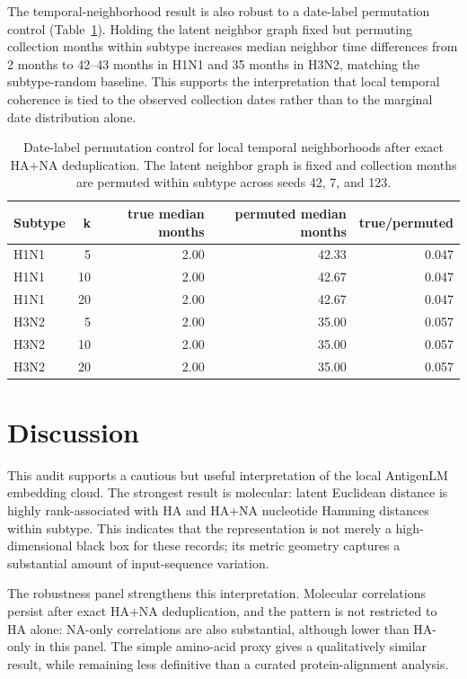 \documentclass[11pt]{article}
\begin{document}
The temporal-neighborhood result is also robust to a date-label permutation control (Table~\ref{tab:temporal-permutation}). Holding the latent neighbor graph fixed but permuting collection months within subtype increases median neighbor time differences from 2 months to 42--43 months in H1N1 and 35 months in H3N2, matching the subtype-random baseline. This supports the interpretation that local temporal coherence is tied to the observed collection dates rather than to the marginal date distribution alone.

\begin{table}[H]
\centering
\caption{Date-label permutation control for local temporal neighborhoods after exact HA+NA deduplication. The latent neighbor graph is fixed and collection months are permuted within subtype across seeds 42, 7, and 123.}
\label{tab:temporal-permutation}
\begin{tabular}{lrrrr}
\toprule
Subtype & k & true median months & permuted median months & true/permuted \\
\midrule
H1N1 & 5 & 2.00 & 42.33 & 0.047 \\
H1N1 & 10 & 2.00 & 42.67 & 0.047 \\
H1N1 & 20 & 2.00 & 42.67 & 0.047 \\
H3N2 & 5 & 2.00 & 35.00 & 0.057 \\
H3N2 & 10 & 2.00 & 35.00 & 0.057 \\
H3N2 & 20 & 2.00 & 35.00 & 0.057 \\
\bottomrule
\end{tabular}
\end{table}

\section{Discussion}

This audit supports a cautious but useful interpretation of the local AntigenLM embedding cloud. The strongest result is molecular: latent Euclidean distance is highly rank-associated with HA and HA+NA nucleotide Hamming distances within subtype. This indicates that the representation is not merely a high-dimensional black box for these records; its metric geometry captures a substantial amount of input-sequence variation.

The robustness panel strengthens this interpretation. Molecular correlations persist after exact HA+NA deduplication, and the pattern is not restricted to HA alone: NA-only correlations are also substantial, although lower than HA-only in this panel. The simple amino-acid proxy gives a qualitatively similar result, while remaining less definitive than a curated protein-alignment analysis.
\end{document}
